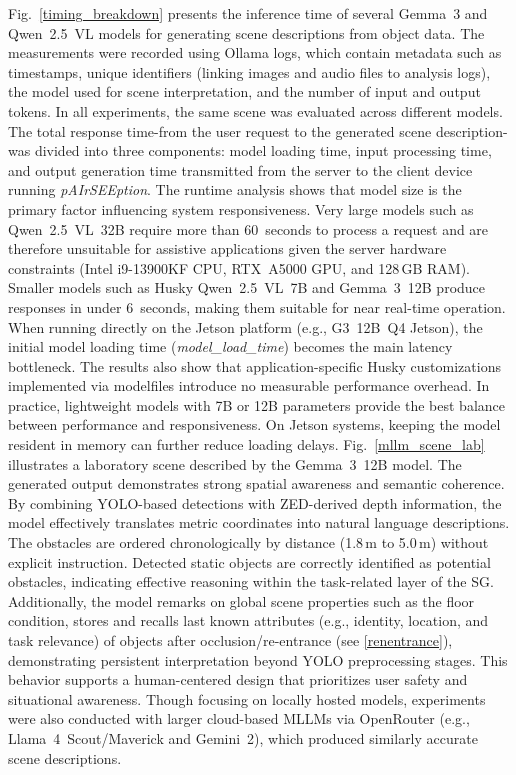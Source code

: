 \documentclass[lettersize,journal]{IEEEtran}
\begin{document}
Fig.~\ref{timing_breakdown} presents the inference time of several Gemma~3 and Qwen~2.5~VL models for generating scene descriptions from object data. The measurements were recorded using Ollama logs, which contain metadata such as timestamps, unique identifiers (linking images and audio files to analysis logs), the model used for scene interpretation, and the number of input and output tokens. In all experiments, the same scene was evaluated across different models. The total response time-from the user request to the generated scene description-was divided into three components: model loading time, input processing time, and output generation time transmitted from the server to the client device running \textit{pAIrSEEption}. The runtime analysis shows that model size is the primary factor influencing system responsiveness. Very large models such as Qwen~2.5~VL~32B require more than 60~seconds to process a request and are therefore unsuitable for assistive applications given the server hardware constraints (Intel i9-13900KF CPU, RTX~A5000 GPU, and 128\,GB RAM). Smaller models such as Husky Qwen~2.5~VL~7B and Gemma~3~12B produce responses in under 6~seconds, making them suitable for near real-time operation. When running directly on the Jetson platform (e.g., G3~12B~Q4 Jetson), the initial model loading time (\textit{model\_load\_time}) becomes the main latency bottleneck. The results also show that application-specific Husky customizations implemented via modelfiles introduce no measurable performance overhead. In practice, lightweight models with 7B or 12B parameters provide the best balance between performance and responsiveness. On Jetson systems, keeping the model resident in memory can further reduce loading delays. Fig.~\ref{mllm_scene_lab} illustrates a laboratory scene described by the Gemma~3~12B model. The generated output demonstrates strong spatial awareness and semantic coherence. By combining YOLO-based detections with ZED-derived depth information, the model effectively translates metric coordinates into natural language descriptions. The obstacles are ordered chronologically by distance (1.8\,m to 5.0\,m) without explicit instruction. Detected static objects are correctly identified as potential obstacles, indicating effective reasoning within the task-related layer of the SG. Additionally, the model remarks on global scene properties such as the floor condition,  stores and recalls last known attributes (e.g., identity, location, and task relevance) of objects  after occlusion/re-entrance (see \cref{renentrance}), demonstrating persistent interpretation  beyond  YOLO preprocessing stages. This behavior supports a human-centered design that prioritizes user safety and situational awareness. Though focusing on locally hosted models,  experiments were also conducted with larger cloud-based MLLMs via OpenRouter (e.g., Llama~4~Scout/Maverick and Gemini~2), which produced similarly accurate scene descriptions.
\end{document}
